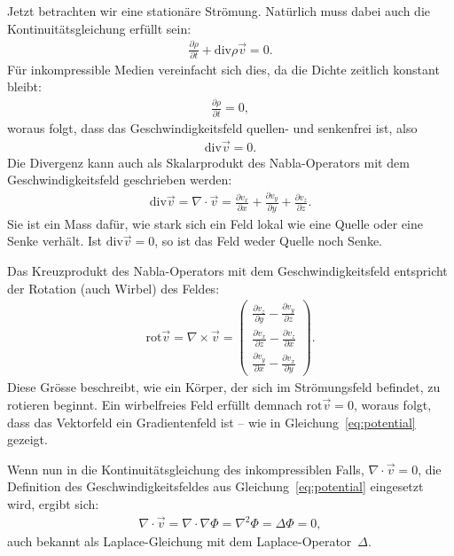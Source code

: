 Jetzt betrachten wir eine stationäre Strömung.  
Natürlich muss dabei auch die Kontinuitätsgleichung
erfüllt sein:
\begin{align*}
    \frac{\partial \rho}{\partial t}
    + 
    \mathrm{div} \rho\vec{v} 
    = 
    0.
\end{align*}
Für inkompressible Medien vereinfacht sich dies, 
da die Dichte zeitlich konstant bleibt:
\begin{align*}
    \frac{\partial \rho}{\partial t} 
    = 
    0,
\end{align*}
woraus folgt, dass das Geschwindigkeitsfeld 
quellen- und senkenfrei ist, also
\begin{align*}
    \mathrm{div} \vec{v} 
    = 
    0.
\end{align*}
Die Divergenz kann auch als Skalarprodukt 
des Nabla-Operators mit dem Geschwindigkeitsfeld 
geschrieben werden:
\begin{align*}
    \mathrm{div} \vec{v}
    = 
    \nabla \cdot \vec{v}
    = 
    \frac{\partial v_x}{\partial x} 
    +
    \frac{\partial v_y}{\partial y} 
    +
    \frac{\partial v_z}{\partial z}.
\end{align*}
Sie ist ein Mass dafür, wie stark sich ein Feld lokal 
wie eine Quelle oder eine Senke verhält.  
Ist $\mathrm{div} \vec{v} = 0$, 
so ist das Feld weder Quelle noch Senke.

Das Kreuzprodukt des Nabla-Operators mit 
dem Geschwindigkeitsfeld entspricht der Rotation 
(auch Wirbel) des Feldes:
\begin{align*}
    \mathrm{rot} \vec{v} 
    = 
    \nabla \times \vec{v}
    =
    \begin{pmatrix}
        \frac{\partial v_z}{\partial y} - \frac{\partial v_y}{\partial z} \\
        \frac{\partial v_x}{\partial z} - \frac{\partial v_z}{\partial x} \\
        \frac{\partial v_y}{\partial x} - \frac{\partial v_x}{\partial y}
    \end{pmatrix}.
\end{align*}
Diese Grösse beschreibt, wie ein Körper, 
der sich im Strömungsfeld befindet, zu rotieren beginnt.  
Ein wirbelfreies Feld erfüllt demnach
 $\mathrm{rot} \vec{v} = 0$,  
woraus folgt, dass das Vektorfeld ein Gradientenfeld 
ist – wie in Gleichung~\eqref{eq:potential} gezeigt.

Wenn nun in die Kontinuitätsgleichung des inkompressiblen 
Falls, $\nabla \cdot \vec{v} = 0$, 
die Definition des Geschwindigkeitsfeldes 
aus Gleichung~\eqref{eq:potential} eingesetzt wird, 
ergibt sich:
\begin{align}
    \nabla \cdot \vec{v}
    = 
    \nabla \cdot \nabla \Phi
    = 
    \nabla^2 \Phi
    = 
    \Delta \Phi
    = 
    0, \label{eq:laplace}
\end{align}
auch bekannt als Laplace-Gleichung mit dem 
Laplace-Operator~$\Delta$.



